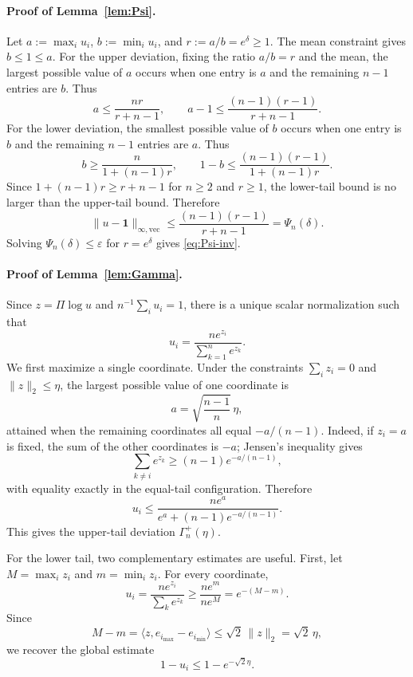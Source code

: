 \documentclass[10pt]{article}
\numberwithin{equation}{section}
\theoremstyle{plain}
\theoremstyle{definition}
\theoremstyle{remark}
\newcommand{\ones}{\mathbf{1}}
\begin{document}
\paragraph{Proof of Lemma~\ref{lem:Psi}.}
Let \(a:=\max_i u_i\), \(b:=\min_i u_i\), and \(r:=a/b=e^\delta\ge1\).
The mean constraint gives \(b\le1\le a\). For the upper deviation, fixing the
ratio \(a/b=r\) and the mean, the largest possible value of \(a\) occurs when
one entry is \(a\) and the remaining \(n-1\) entries are \(b\). Thus
\[
        a\le \frac{nr}{r+n-1},
        \qquad
        a-1\le \frac{(n-1)(r-1)}{r+n-1}.
\]
For the lower deviation, the smallest possible value of \(b\) occurs when one
entry is \(b\) and the remaining \(n-1\) entries are \(a\). Thus
\[
        b\ge \frac{n}{1+(n-1)r},
        \qquad
        1-b\le \frac{(n-1)(r-1)}{1+(n-1)r}.
\]
Since \(1+(n-1)r\ge r+n-1\) for \(n\ge2\) and \(r\ge1\), the lower-tail bound is
no larger than the upper-tail bound. Therefore
\[
        \|u-\ones\|_{\infty,\mathrm{vec}}
        \le
        \frac{(n-1)(r-1)}{r+n-1}
        =\Psi_n(\delta).
\]
Solving \(\Psi_n(\delta)\le\varepsilon\) for \(r=e^\delta\) gives
\eqref{eq:Psi-inv}.

\paragraph{Proof of Lemma~\ref{lem:Gamma}.}
Since \(z=\Pi\log u\) and \(n^{-1}\sum_i u_i=1\), there is a unique scalar
normalization such that
\[
        u_i=\frac{n e^{z_i}}{\sum_{k=1}^n e^{z_k}}.
\]
We first maximize a single coordinate. Under the constraints \(\sum_i z_i=0\)
and \(\|z\|_2\le\eta\), the largest possible value of one coordinate is
\[
        a=\sqrt{\frac{n-1}{n}}\,\eta,
\]
attained when the remaining coordinates all equal \(-a/(n-1)\). Indeed, if
\(z_i=a\) is fixed, the sum of the other coordinates is \(-a\); Jensen's
inequality gives
\[
        \sum_{k\ne i}e^{z_k}
        \ge
        (n-1)e^{-a/(n-1)},
\]
with equality exactly in the equal-tail configuration. Therefore
\[
        u_i
        \le
        \frac{n e^a}{e^a+(n-1)e^{-a/(n-1)}}.
\]
This gives the upper-tail deviation \(\Gamma_n^+(\eta)\).

For the lower tail, two complementary estimates are useful. First, let
\(M=\max_i z_i\) and \(m=\min_i z_i\). For every coordinate,
\[
        u_i
        =
        \frac{n e^{z_i}}{\sum_k e^{z_k}}
        \ge
        \frac{n e^m}{n e^M}
        =
        e^{-(M-m)}.
\]
Since
\[
        M-m
        =
        \langle z,e_{i_{\max}}-e_{i_{\min}}\rangle
        \le
        \sqrt{2}\,\|z\|_2
        =
        \sqrt{2}\,\eta,
\]
we recover the global estimate
\[
        1-u_i\le1-e^{-\sqrt{2}\eta}.
\]
\end{document}
